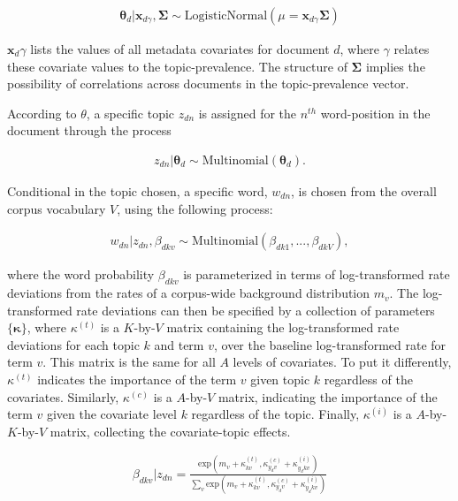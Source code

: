 \documentclass[12pt,a4paper,notitlepage]{article}
\begin{document}
\begin{align*}
	\boldsymbol{\theta}_d|\boldsymbol{x}_{d\gamma},\boldsymbol{\Sigma} \sim \textrm{LogisticNormal}(\mu = \boldsymbol{x}_{d\gamma}\boldsymbol{\Sigma})
\end{align*}

$\boldsymbol{x}_d\gamma$ lists the values of all metadata covariates for document $d$, where $\gamma$ relates these covariate values to the topic-prevalence. The structure of $\boldsymbol{\Sigma}$ implies the possibility of correlations across documents in the topic-prevalence vector. 

According to $\theta$, a specific topic $z_{dn}$ is assigned for the $n^{th}$ word-position in the document through the process

\begin{align*}
	z_{dn}|\boldsymbol{\theta}_d \sim \textrm{Multinomial}(\boldsymbol{\theta}_d).
\end{align*}

Conditional in the topic chosen, a specific word, $w_{dn}$, is chosen from the overall corpus vocabulary $V$, using the following process:

\begin{align*}
	w_{dn}|z_{dn},\beta_{dkv} \sim \textrm{Multinomial}(\beta_{dk1},...,\beta_{dkV}),
\end{align*}

where the word probability $\beta_{dkv}$ is parameterized in terms of log-transformed rate deviations from the rates of a corpus-wide background distribution $m_v$. The log-transformed rate deviations can then be specified by a collection of parameters $\lbrace \boldsymbol{\kappa} \rbrace$, where $\kappa^{(t)}$ is a $K$-by-$V$ matrix containing the log-transformed rate deviations for each topic $k$ and term $v$, over the baseline log-transformed rate for term $v$. This matrix is the same for all $A$ levels of covariates. To put it differently, $\kappa^{(t)}$ indicates the importance of the term $v$ given topic $k$ regardless of the covariates. Similarly, $\kappa^{(c)}$ is a $A$-by-$V$ matrix, indicating the importance of the term $v$ given the covariate level $k$ regardless of the topic. Finally, $\kappa^{(i)}$ is a $A$-by-$K$-by-$V$ matrix, collecting the covariate-topic effects.

\begin{align*}
	\beta_{dkv}|z_{dn}=\frac{\textrm{exp}(m_v+\kappa^{(t)}_{kv},\kappa^{(c)}_{y_dv}+\kappa^{(i)}_{y_dkv})}{\sum_v \textrm{exp}(m_v+\kappa^{(t)}_{kv},\kappa^{(c)}_{y_dv}+\kappa^{(i)}_{y_dkv})}
\end{align*}
\end{document}
